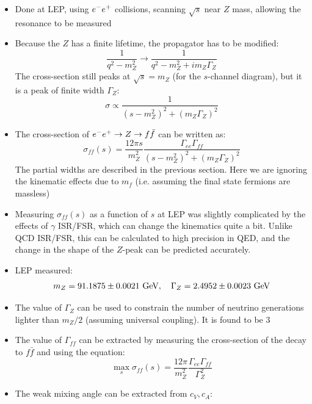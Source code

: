 \begin{itemize}
  \item Done at LEP, using $e^{-} e^{+}$ collisions, scanning $\sqrt s$ near $Z$ mass, allowing the resonance to be measured
  \item Because the $Z$ has a finite lifetime, the propagator has to be modified:
  \begin{equation}
    \frac{1}{q^2-m_Z^2} \rightarrow \frac{1}{q^2-m_Z^2 + im_Z\Gamma_Z}
  \end{equation}
  The cross-section still peaks at $\sqrt s = m_Z$ (for the $s$-channel diagram), but it is a peak of finite width $\Gamma_Z$:
  \begin{equation}
    \sigma \propto \frac{1}{(s-m_Z^2)^2 + (m_Z\Gamma_Z)^2}
  \end{equation}
  \item The cross-section of $e^{-}e^{+}\rightarrow Z \rightarrow f\bar f$ can be written as:
  \begin{equation}
    \sigma_{ff}(s) = \frac{12\pi s}{m_Z^2} \frac{\Gamma_{ee}\Gamma_{ff}}{(s-m_Z^2)^2 + (m_Z\Gamma_Z)^2}
  \end{equation}
  The partial widths are described in the previous section. Here we are ignoring the kinematic effects due to $m_f$ (i.e. assuming the final state fermions are massless)
  \item Measuring $\sigma_{ff}(s)$ as a function of $s$ at LEP was slightly complicated by the effects of $\gamma$ ISR/FSR, which can change the kinematics quite a bit. Unlike QCD ISR/FSR, this can be calculated to high precision in QED, and the change in the shape of the $Z$-peak can be predicted accurately.
  \item LEP measured:
  \begin{equation}
    m_Z = 91.1875 \pm 0.0021~\text{GeV}, \quad \Gamma_Z = 2.4952 \pm 0.0023 ~\text{GeV}
  \end{equation}
  \item The value of $\Gamma_Z$ can be used to constrain the number of neutrino generations lighter than $m_Z/2$ (assuming universal coupling). It is found to be $3$
  \item The value of $\Gamma_{ff}$ can be extracted by measuring the cross-section of the decay to $f\bar f$ and using the equation:
  \begin{equation}
    \max_s \sigma_{ff}(s) = \frac{12\pi}{m_Z^2} \frac{\Gamma_{ee} \Gamma_{ff}}{\Gamma_Z^2}
  \end{equation}
  \item The weak mixing angle can be extracted from $c_V,c_A$:

\end{itemize}
